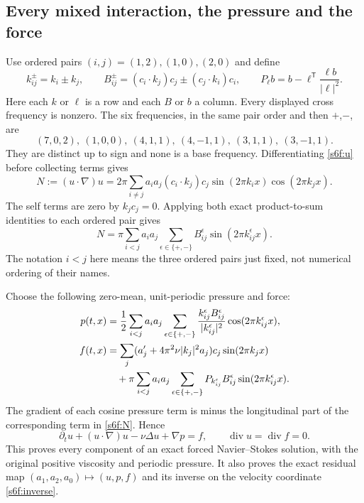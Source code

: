 \subsection{Every mixed interaction, the pressure and the force}
\label{s6f:force}
Use ordered pairs $(i,j)=(1,2),(1,0),(2,0)$ and define
\[
 k_{ij}^{\pm}=k_i\pm k_j,\qquad
 B_{ij}^{\pm}=(c_i\cdot k_j)c_j\pm(c_j\cdot k_i)c_i,
 \qquad
 P_\ell b=b-\ell^{\mathsf T}\frac{\ell b}{|\ell|^2}.
\]
Here each $k$ or $\ell$ is a row and each $B$ or $b$ a column.
Every displayed cross frequency is nonzero. The six frequencies,
in the same pair order and then $+$,$-$, are
\[
 (7,0,2),\ (1,0,0),\ (4,1,1),\ (4,-1,1),\
 (3,1,1),\ (3,-1,1).
\]
They are distinct up to sign and none is a base frequency.
Differentiating \eqref{s6f:u} before collecting terms gives
\[
 N:=(u\cdot\nabla)u
 =2\pi\sum_{i\ne j}a_ia_j(c_i\cdot k_j)c_j
                       \sin(2\pi k_ix)\cos(2\pi k_jx).
\]
The self terms are zero by $k_jc_j=0$. Applying both exact
product-to-sum identities to each ordered pair gives
\begin{equation}
 N=\pi\sum_{i<j}a_ia_j\sum_{\epsilon\in\{+,-\}}
             B_{ij}^{\epsilon}\sin(2\pi k_{ij}^{\epsilon}x).
 \label{s6f:N}
\end{equation}
The notation $i<j$ here means the three ordered pairs just fixed,
not numerical ordering of their names.

Choose the following zero-mean, unit-periodic pressure and force:
\begin{align}
 p(t,x)&=\frac12\sum_{i<j}a_ia_j\sum_{\epsilon\in\{+,-\}}
 \frac{k_{ij}^{\epsilon}B_{ij}^{\epsilon}}
 {|k_{ij}^{\epsilon}|^2}\cos(2\pi k_{ij}^{\epsilon}x),
 \label{s6f:p}\\
 f(t,x)&=\sum_j(a_j'+4\pi^2\nu|k_j|^2a_j)c_j\sin(2\pi k_jx)
 \notag\\
 &\quad+\pi\sum_{i<j}a_ia_j\sum_{\epsilon\in\{+,-\}}
       P_{k_{ij}^{\epsilon}}B_{ij}^{\epsilon}
                            \sin(2\pi k_{ij}^{\epsilon}x).
 \label{s6f:f}
\end{align}
The gradient of each cosine pressure term is minus the longitudinal
part of the corresponding term in \eqref{s6f:N}. Hence
\[
 \partial_tu+(u\cdot\nabla)u-\nu\Delta u+\nabla p=f,
 \qquad\operatorname{div}u=\operatorname{div}f=0.
\]
This proves every component of an exact forced Navier--Stokes
solution, with the original positive viscosity and periodic pressure.
It also proves the exact residual map $(a_1,a_2,a_0)\mapsto(u,p,f)$
and its inverse on the velocity coordinate \eqref{s6f:inverse}.

